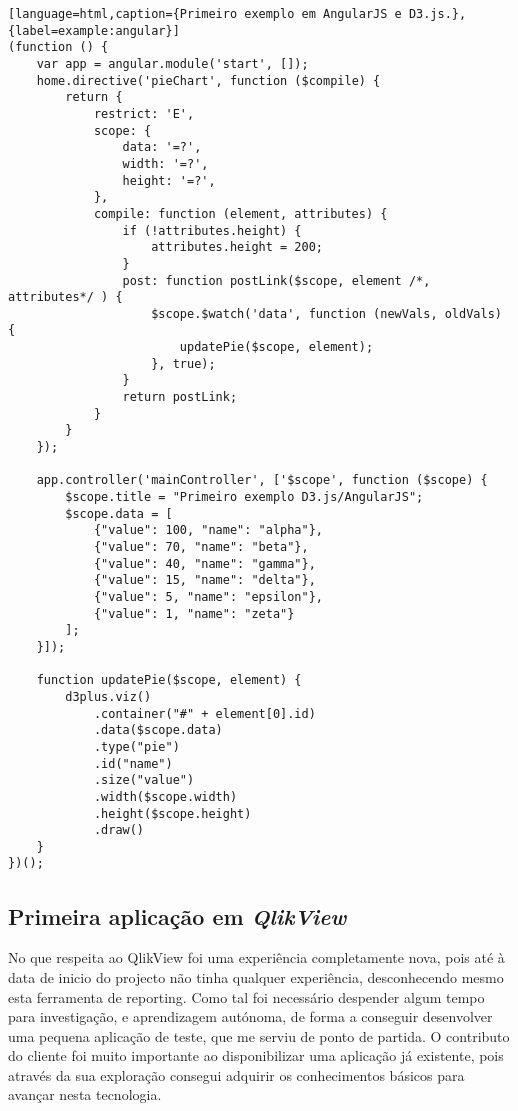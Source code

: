 \begin{lstlisting}[language=html,caption={Primeiro exemplo em AngularJS e D3.js.},{label=example:angular}]
(function () {
    var app = angular.module('start', []);
    home.directive('pieChart', function ($compile) {
        return {
            restrict: 'E',
            scope: {
                data: '=?',
                width: '=?',
                height: '=?',
            },
            compile: function (element, attributes) {
                if (!attributes.height) {
                    attributes.height = 200;
                }
                post: function postLink($scope, element /*, attributes*/ ) {
                    $scope.$watch('data', function (newVals, oldVals) {
                        updatePie($scope, element);
                    }, true);
                }
                return postLink;
            }
        }
    });

    app.controller('mainController', ['$scope', function ($scope) {
        $scope.title = "Primeiro exemplo D3.js/AngularJS";
        $scope.data = [
            {"value": 100, "name": "alpha"},
            {"value": 70, "name": "beta"},
            {"value": 40, "name": "gamma"},
            {"value": 15, "name": "delta"},
            {"value": 5, "name": "epsilon"},
            {"value": 1, "name": "zeta"}
        ];
    }]);

    function updatePie($scope, element) {
        d3plus.viz()
            .container("#" + element[0].id)
            .data($scope.data)
            .type("pie")
            .id("name")
            .size("value")
            .width($scope.width)
            .height($scope.height)
            .draw()
    }
})();
\end{lstlisting}


\subsection{Primeira aplicação em \textit{QlikView}}
\par No que respeita ao QlikView foi uma experiência completamente nova, pois até à data de inicio do projecto não tinha qualquer experiência, desconhecendo mesmo esta ferramenta de reporting. Como tal foi necessário despender algum tempo para investigação, e aprendizagem autónoma, de forma a conseguir desenvolver uma pequena aplicação de teste, que me serviu de ponto de partida. O contributo do cliente foi muito importante ao disponibilizar uma aplicação já existente, pois através da sua exploração consegui adquirir os conhecimentos básicos para avançar nesta tecnologia.
